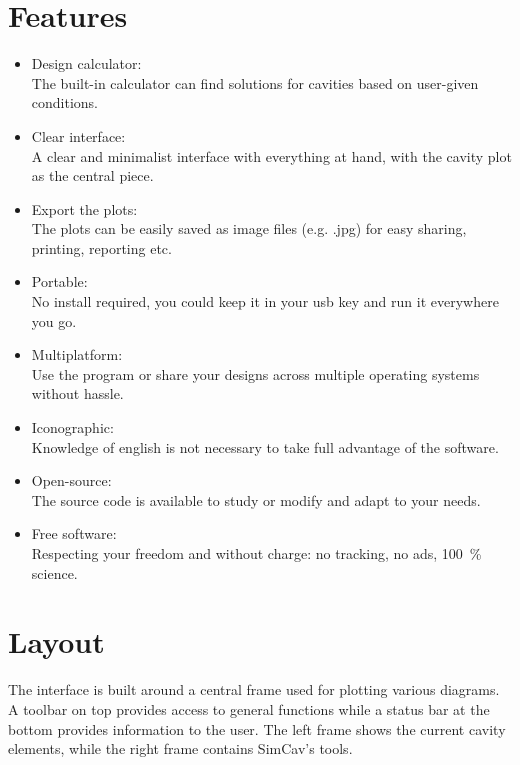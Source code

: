 \documentclass[11pt,a4paper,article,oneside]{memoir}
\begin{document}
	\section{Features}
	\begin{itemize}
		\item Design calculator:\\
		The built-in calculator can find solutions for cavities based on user-given conditions.
		
		\item Clear interface:\\
		A clear and minimalist interface with everything at hand, with the cavity plot as the central piece.
		
		\item Export the plots:\\
		The plots can be easily saved as image files (e.g. .jpg) for easy sharing, printing, reporting etc.
		
		\item Portable:\\
		No install required, you could keep it in your usb key and run it everywhere you go.
		
		\item Multiplatform:\\
		Use the program or share your designs across multiple operating systems without hassle.
		
		\item Iconographic:\\
		Knowledge of english is not necessary to take full advantage of the software.
		
		\item Open-source:\\
		The source code is available to study or modify and adapt to your needs.
		
		\item Free software:\\
		Respecting your freedom and without charge: no tracking, no ads, \SI{100}{\percent} science.
	\end{itemize}
	
	\section{Layout}
	The interface is built around a central frame used for plotting various diagrams. A toolbar on top provides access to general functions while a status bar at the bottom provides information to the user. The left frame shows the current cavity elements, while the right frame contains SimCav's tools.
	
\end{document}
